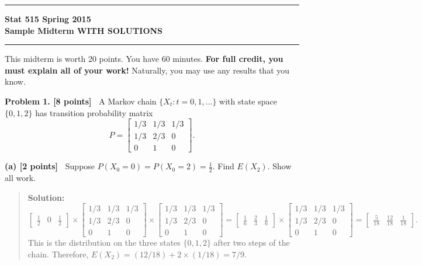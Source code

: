 \documentclass{article}
\newcommand{\svskip}{\vspace{.2in}}
\newcommand{\mvskip}{\vspace{.25in}}
\begin{document}
        \hrule
        \begin{center}
        \Large\bf Stat 515 \hfill Spring 2015\\
        Sample Midterm  \hfill WITH SOLUTIONS
        \end{center}
        \hrule


\mvskip 
This midterm is worth 20 points.  You have 60 minutes.  
{\bf For full credit, you must explain all of your work!}
Naturally, you may use any results that you know.

\mvskip 
{\bf Problem 1. [8 points]\ } 
A Markov chain $\{X_t: t=0, 1, \ldots\}$ with state space $\{0, 1, 2\}$ has transition probability matrix
\[
P=
\begin{bmatrix}
1/3 & 1/3 & 1/3 \\ 
1/3 & 2/3 & 0 \\
0 & 1 & 0
\end{bmatrix}.
\]

\svskip
{\bf(a) [2 points]\ }
Suppose $P(X_0=0) = P(X_0=2) = \frac12$.  Find $E(X_2)$.  Show all work.
  \begin{quotation}{\bf Solution:}
  \[
  \begin{bmatrix}
  \frac12 & 0 & \frac12
  \end{bmatrix}
  \times
  \begin{bmatrix}
  1/3 & 1/3 & 1/3 \\ 
  1/3 & 2/3 & 0 \\
  0 & 1 & 0
  \end{bmatrix}
  \times
  \begin{bmatrix}
  1/3 & 1/3 & 1/3 \\  
  1/3 & 2/3 & 0 \\
  0 & 1 & 0
  \end{bmatrix} =
  \begin{bmatrix}
  \frac16 & \frac23 & \frac16
  \end{bmatrix}
  \times
  \begin{bmatrix}
  1/3 & 1/3 & 1/3 \\ 
  1/3 & 2/3 & 0 \\
  0 & 1 & 0
  \end{bmatrix}
  =
  \begin{bmatrix}
  \frac{5}{18} & \frac{12}{18} & \frac{1}{18}
  \end{bmatrix}.
  \]
  This is the distribution on the three states $\{0, 1, 2\}$ after two steps of the chain.
  Therefore, $E(X_2) = (12/18) + 2\times(1/18) = 7/9$.
  \end{quotation}
  
\end{document}
